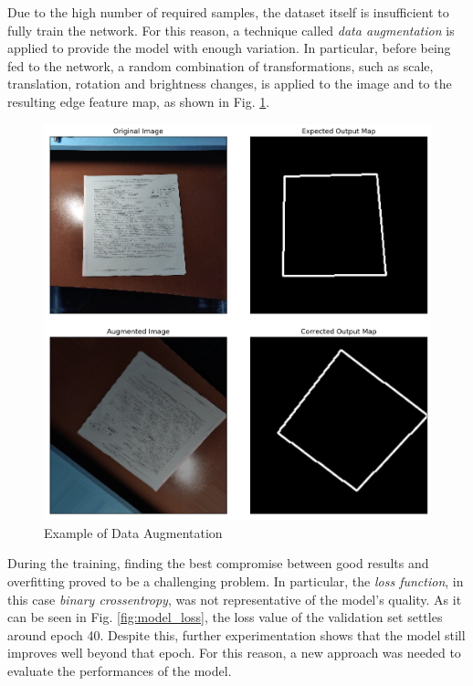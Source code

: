 \documentclass[a4paper]{article}
\begin{document}
Due to the high number of required samples, the dataset itself is insufficient to fully train the network.
For this reason, a technique called \textit{data augmentation} is applied to provide the model
with enough variation. In particular, before being fed to the network, a random combination of transformations, such as scale, translation, rotation and brightness changes, is applied to the image and to the resulting edge feature map, as shown in Fig. \ref{fig:augmented_image}.

\begin{figure}[H]
	\includegraphics[width=\linewidth]{augmented_image.png}
	\caption{Example of Data Augmentation}
	\label{fig:augmented_image}
\end{figure}

During the training, finding the best compromise between good results and overfitting proved to be a challenging problem. In particular, the \textit{loss function}, in this case \textit{binary crossentropy}, 
was not representative of the model's quality. As it can be seen in Fig. \ref{fig:model_loss}, the loss value of the validation set settles around epoch 40. Despite this, further experimentation shows that the model still improves well beyond that epoch. For this reason, a new approach was needed to evaluate the performances of the model.
\end{document}
